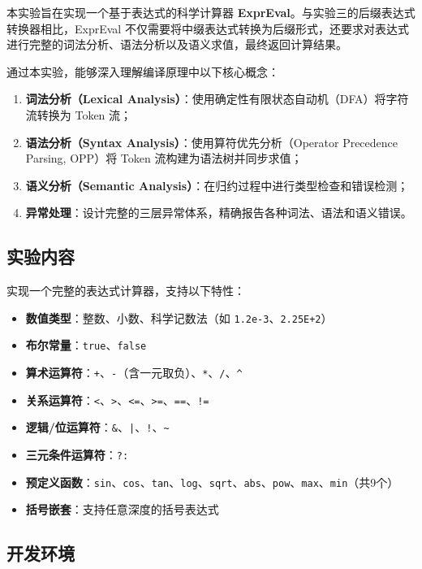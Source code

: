 \documentclass[a4paper]{article}
\begin{document}
本实验旨在实现一个基于表达式的科学计算器 \textbf{ExprEval}。与实验三的后缀表达式转换器相比，ExprEval 不仅需要将中缀表达式转换为后缀形式，还要求对表达式进行完整的词法分析、语法分析以及语义求值，最终返回计算结果。

通过本实验，能够深入理解编译原理中以下核心概念：
\begin{enumerate}
    \item \textbf{词法分析（Lexical Analysis）}：使用确定性有限状态自动机（DFA）将字符流转换为 Token 流；
    \item \textbf{语法分析（Syntax Analysis）}：使用算符优先分析（Operator Precedence Parsing, OPP）将 Token 流构建为语法树并同步求值；
    \item \textbf{语义分析（Semantic Analysis）}：在归约过程中进行类型检查和错误检测；
    \item \textbf{异常处理}：设计完整的三层异常体系，精确报告各种词法、语法和语义错误。
\end{enumerate}

\subsection{实验内容}

实现一个完整的表达式计算器，支持以下特性：

\begin{itemize}
    \item \textbf{数值类型}：整数、小数、科学记数法（如 \texttt{1.2e-3}、\texttt{2.25E+2}）
    \item \textbf{布尔常量}：\texttt{true}、\texttt{false}
    \item \textbf{算术运算符}：\texttt{+}、\texttt{-}（含一元取负）、\texttt{*}、\texttt{/}、\texttt{\^}
    \item \textbf{关系运算符}：\texttt{<}、\texttt{>}、\texttt{<=}、\texttt{>=}、\texttt{==}、\texttt{!=}
    \item \textbf{逻辑/位运算符}：\texttt{\&}、\texttt{|}、\texttt{!}、\texttt{\textasciitilde}
    \item \textbf{三元条件运算符}：\texttt{?:}
    \item \textbf{预定义函数}：\texttt{sin}、\texttt{cos}、\texttt{tan}、\texttt{log}、\texttt{sqrt}、\texttt{abs}、\texttt{pow}、\texttt{max}、\texttt{min}（共9个）
    \item \textbf{括号嵌套}：支持任意深度的括号表达式
\end{itemize}

\subsection{开发环境}
\end{document}
